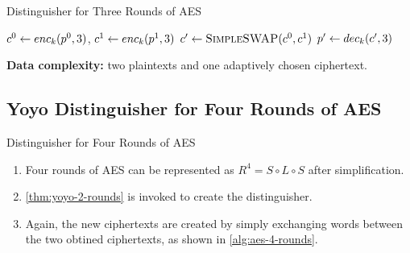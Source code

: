 \documentclass[notheorems]{beamer}
\theoremstyle{definition}
\theoremstyle{example}
\begin{document}
    \begin{frame}{Distinguisher for Three Rounds of AES}
        \begin{algorithm}[H]
            \caption{Distinguisher for Three Rounds of AES}
            \label{alg:aes-3-rounds}
            \begin{algorithmic}[1]
                \State \(c^0 \gets enc_k(p^0, 3)\), \(c^1 \gets enc_k(p^1,
                3)\)
                \State \(c^\prime \gets \textsc{SimpleSWAP}(c^0, c^1)\)
                \State \(p^\prime \gets dec_k(c^\prime, 3)\)
                    \State {}
                \Else
                    \State {}
                \EndIf
            \end{algorithmic}
        \end{algorithm}
        \textbf{Data complexity:} two plaintexts and one adaptively chosen
        ciphertext.
    \end{frame}

    \subsection{Yoyo Distinguisher for Four Rounds of AES}
    \label{subsec:aes-4-rounds}

    \begin{frame}{Distinguisher for Four Rounds of AES}
    \begin{enumerate}
        \item<1-> Four rounds of AES can be represented as \(R^4 = S \circ L
        \circ S\) after simplification. 
        \item<2-> \cref{thm:yoyo-2-rounds} is invoked to create the
        distinguisher.
        \item<3-> Again, the new ciphertexts are created by simply exchanging
        words between the two obtined ciphertexts, as shown in
        \cref{alg:aes-4-rounds}.
    \end{enumerate}
    \end{frame}
\end{document}
